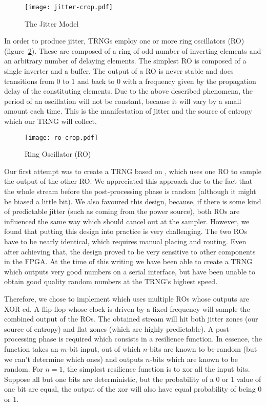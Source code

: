 \documentclass[conference]{IEEEtran}
\begin{document}
\begin{figure}
\centering
\texttt{[image: jitter-crop.pdf]}
\caption{The Jitter Model}
\label{fig:jitter}
\end{figure}

In order to produce jitter, TRNGs employ one or more ring oscillators (RO) (figure~\ref{fig:ro}). These are composed of a ring of odd number of inverting elements and an arbitrary number of delaying elements. The simplest RO is composed of a single inverter and a buffer. The output of a RO is never stable and does transitions from 0 to 1 and back to 0 with a frequency given by the propagation delay of the constituting elements. Due to the above described phenomena, the period of an oscillation will not be constant, because it will vary by a small amount each time. This is the manifestation of jitter and the source of entropy which our TRNG will collect.

\begin{figure}
\centering
\texttt{[image: ro-crop.pdf]}
\caption{Ring Oscillator (RO)}
\label{fig:ro}
\end{figure}

Our first attempt was to create a TRNG based on \cite{Ko04}, which uses one RO to sample the output of the other RO. We appreciated this approach due to the fact that the whole stream before the post-processing phase is random (although it might be biased a little bit). We also favoured this design, because, if there is some kind of predictable jitter (such as coming from the power source), both ROs are influenced the same way which should cancel out at the sampler. However, we found that putting this design into practice is very challenging. The two ROs have to be nearly identical, which requires manual placing and routing. Even after achieving that, the design proved to be very sensitive to other components in the FPGA. At the time of this writing we have been able to create a TRNG which outputs very good numbers on a serial interface, but have been unable to obtain good quality random numbers at the TRNG's highest speed.

Therefore, we chose to implement \cite{Su06} which uses multiple ROs whose outputs are XOR-ed. A flip-flop whose clock is driven by a fixed frequency will sample the combined output of the ROs. The obtained stream will hit both jitter zones (our source of entropy) and flat zones (which are highly predictable). A post-processing phase is required which consists in a resilience function\cite{Resilience}. In essence, the function takes an $m$-bit input, out of which $n$-bits are known to be random (but we can't determine which ones) and outputs $n$-bits which are known to be random. For $n=1$, the simplest resilience function is to xor all the input bits. Suppose all but one bits are deterministic, but the probability of a 0 or 1 value of one bit are equal, the output of the xor will also have equal probability of being 0 or 1.
\end{document}
